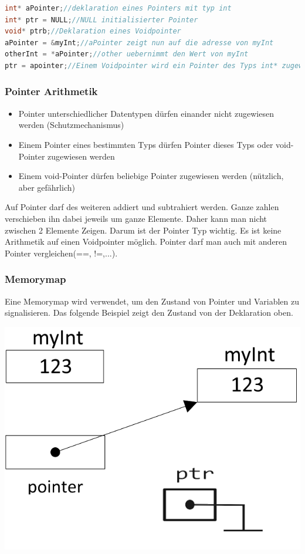\begin{lstlisting}[language = c]
int* aPointer;//deklaration eines Pointers mit typ int
int* ptr = NULL;//NULL initialisierter Pointer
void* ptrb;//Deklaration eines Voidpointer
aPointer = &myInt;//aPointer zeigt nun auf die adresse von myInt
otherInt = *aPointer;//other uebernimmt den Wert von myInt
ptr = apointer;//Einem Voidpointer wird ein Pointer des Typs int* zugewisen
\end{lstlisting}

\subsubsection{Pointer Arithmetik}

\begin{itemize}[itemsep=1pt, parsep=0pt]
    \item Pointer unterschiedlicher Datentypen dürfen einander nicht zugewiesen werden (Schutzmechanismus)
    \item Einem Pointer eines bestimmten Typs dürfen Pointer dieses Typs oder void-Pointer zugewiesen werden
    \item Einem void-Pointer dürfen beliebige Pointer zugewiesen werden (nützlich, aber gefährlich)
\end{itemize}
Auf Pointer darf des weiteren addiert und subtrahiert werden. Ganze zahlen verschieben ihn dabei jeweils um ganze Elemente. Daher kann man nicht zwischen 2 Elemente Zeigen. Darum ist der Pointer Typ wichtig. Es ist keine Arithmetik auf einen Voidpointer möglich.\newline
Pointer darf man auch mit anderen Pointer vergleichen(==, !=,...).

\subsubsection{Memorymap}

Eine Memorymap wird verwendet, um den Zustand von Pointer und Variablen zu signalisieren. Das folgende Beispiel zeigt den Zustand von der Deklaration oben.\newline
\begin{center}
    \includegraphics[width=.5\columnwidth]{Pictures/Pointer_memory_map.png}
\end{center}

